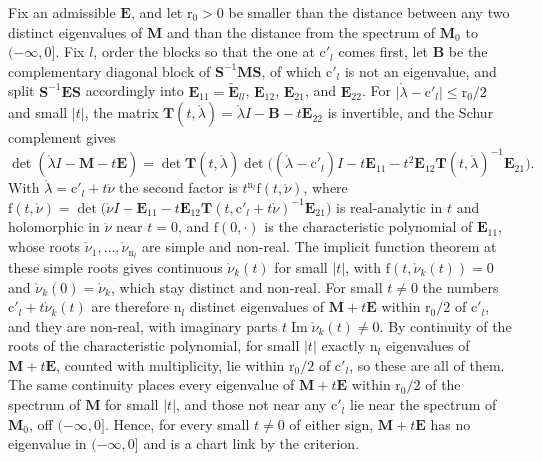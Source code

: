 Fix an admissible \(\mathbf E\), and let \(\mathrm r_0>0\) be smaller than the distance between any two
distinct eigenvalues of \(\mathbf M\) and than the distance from the spectrum of \(\mathbf M_0\) to
\((-\infty,0]\). Fix \(l\), order the blocks so that the one at \(\mathrm c'_l\) comes first, let \(\mathbf B\)
be the complementary diagonal block of \(\mathbf S^{-1}\mathbf M\mathbf S\), of which \(\mathrm c'_l\) is not an
eigenvalue, and split \(\mathbf S^{-1}\mathbf E\mathbf S\) accordingly into
\(\mathbf E_{11}=\widetilde{\mathbf E}_{ll}\), \(\mathbf E_{12}\), \(\mathbf E_{21}\), and \(\mathbf E_{22}\). For
\(\lvert\mathring\lambda-\mathrm c'_l\rvert\leq\mathrm r_0/2\) and small \(\lvert t\rvert\), the matrix
\(\mathbf T(t,\mathring\lambda)=\mathring\lambda I-\mathbf B-t\mathbf E_{22}\) is invertible, and the Schur
complement gives
\[
\det(\mathring\lambda I-\mathbf M-t\mathbf E)
=\det\mathbf T(t,\mathring\lambda)
\det\bigl((\mathring\lambda-\mathrm c'_l)I-t\mathbf E_{11}-t^2\mathbf E_{12}\mathbf T(t,\mathring\lambda)^{-1}\mathbf E_{21}\bigr).
\]
With \(\mathring\lambda=\mathrm c'_l+t\mathring\nu\) the second factor is \(t^{\mathrm n_l}\mathrm f(t,\mathring\nu)\),
where
\(\mathrm f(t,\mathring\nu)=\det\bigl(\mathring\nu I-\mathbf E_{11}-t\mathbf E_{12}\mathbf T(t,\mathrm c'_l+t\mathring\nu)^{-1}\mathbf E_{21}\bigr)\)
is real-analytic in \(t\) and holomorphic in \(\mathring\nu\) near \(t=0\), and \(\mathrm f(0,\cdot)\) is the
characteristic polynomial of \(\mathbf E_{11}\), whose roots \(\mathring\nu_1,\ldots,\mathring\nu_{\mathrm n_l}\) are
simple and non-real. The implicit function theorem at these simple roots gives continuous
\(\mathring\nu_k(t)\) for small \(\lvert t\rvert\), with \(\mathrm f(t,\mathring\nu_k(t))=0\) and
\(\mathring\nu_k(0)=\mathring\nu_k\), which stay distinct and non-real. For small \(t\neq0\) the numbers
\(\mathrm c'_l+t\mathring\nu_k(t)\) are therefore \(\mathrm n_l\) distinct eigenvalues of \(\mathbf M+t\mathbf E\)
within \(\mathrm r_0/2\) of \(\mathrm c'_l\), and they are non-real, with imaginary parts
\(t\operatorname{Im}\mathring\nu_k(t)\neq0\). By continuity of the roots of the characteristic polynomial,
for small \(\lvert t\rvert\) exactly \(\mathrm n_l\) eigenvalues of \(\mathbf M+t\mathbf E\), counted with multiplicity,
lie within \(\mathrm r_0/2\) of \(\mathrm c'_l\), so these are all of them. The same continuity places every
eigenvalue of \(\mathbf M+t\mathbf E\) within \(\mathrm r_0/2\) of the spectrum of \(\mathbf M\) for small
\(\lvert t\rvert\), and those not near any \(\mathrm c'_l\) lie near the spectrum of \(\mathbf M_0\), off
\((-\infty,0]\). Hence, for every small \(t\neq0\) of either sign, \(\mathbf M+t\mathbf E\) has no eigenvalue in
\((-\infty,0]\) and is a chart link by the criterion.

